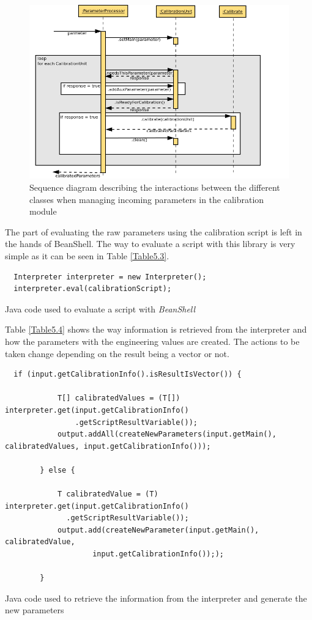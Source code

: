 \begin{figure}[H]
\centerline{\includegraphics[width=1\textwidth]{images/ReceiveParameterAndCalibrateSequence.png}}
\caption{Sequence diagram describing the interactions between the different classes when managing incoming parameters in the calibration module}
\label{f5.6}
\end{figure}


The part of evaluating the raw parameters using the calibration script is left in the hands of BeanShell. The way to evaluate a script with this library is very simple as it can be seen in Table \ref{Table5.3}. 


\begin{table}[h]
\lstset{language=Java}
\begin{lstlisting}
  Interpreter interpreter = new Interpreter();
  interpreter.eval(calibrationScript);
\end{lstlisting}
\caption{Java code used to evaluate a script with \emph{BeanShell}}
\label{Table5.3}
\end{table}


Table \ref{Table5.4} shows the way information is retrieved from the interpreter and how the parameters with the engineering values are created. The actions to be taken change depending on the result being a vector or not.

\begin{table}[H]
\lstset{language=Java}
\begin{lstlisting}
  if (input.getCalibrationInfo().isResultIsVector()) {

            T[] calibratedValues = (T[]) interpreter.get(input.getCalibrationInfo()
                .getScriptResultVariable());
            output.addAll(createNewParameters(input.getMain(), calibratedValues, input.getCalibrationInfo()));

        } else {

            T calibratedValue = (T) interpreter.get(input.getCalibrationInfo()
              .getScriptResultVariable());
            output.add(createNewParameter(input.getMain(), calibratedValue,
                    input.getCalibrationInfo()););

        }
\end{lstlisting}
\caption{Java code used to retrieve the information from the interpreter and generate the new parameters}
\label{Table5.4}
\end{table}


